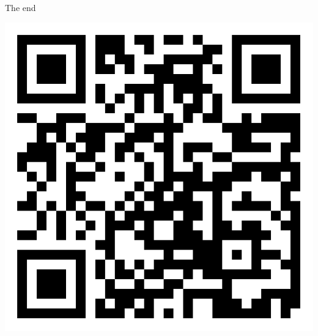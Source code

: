 \documentclass[xcolor={dvipsnames}]{beamer}
\begin{document}
\begin{frame}

    \begin{center}
        \Huge{The end}
    \end{center}

    \begin{center}
        \includegraphics[width=\linewidth,height=\textheight - 50pt,keepaspectratio]{qrcode}
    \end{center}

\end{frame}
\end{document}
